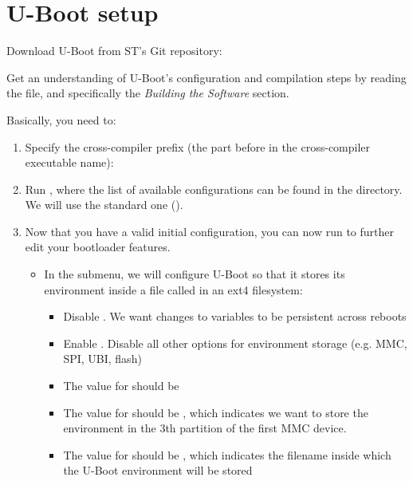 \section{U-Boot setup}

Download U-Boot from ST's Git repository:


Get an understanding of U-Boot's configuration and compilation steps
by reading the  file, and specifically the {\em Building
the Software} section.

Basically, you need to:

\begin{enumerate}

\item Specify the cross-compiler prefix
(the part before  in the cross-compiler executable name):

\item Run , where the list of
  available configurations can be found in the 
  directory. We will use the standard one ().

\item Now that you have a valid initial configuration, you can now run
   to further edit your bootloader
  features.

  \begin{itemize}
  \item In the  submenu, we will configure U-Boot so
    that it stores its environment inside a file called 
    in an ext4 filesystem:
    \begin{itemize}
    \item Disable . We want changes to
      variables to be persistent across reboots
    \item Enable . Disable
      all other options for environment storage (e.g. MMC, SPI, UBI,
      flash)
    \item The value for  should be 
    \item The value for  should be , which indicates
      we want to store the environment in the 3th partition of the
      first MMC device.
    \item The value for  should be , which indicates the
      filename inside which the U-Boot environment will be stored
    \end{itemize}
  \end{itemize}


\end{enumerate}
